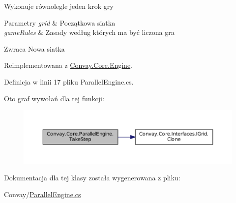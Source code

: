 Wykonuje równolegle jeden krok gry 


\begin{DoxyParams}{Parametry}
{\em grid} & Początkowa siatka\\
\hline
{\em game\+Rules} & Zasady według których ma być liczona gra\\
\hline
\end{DoxyParams}
\begin{DoxyReturn}{Zwraca}
Nowa siatka
\end{DoxyReturn}


Reimplementowana z \hyperlink{class_convay_1_1_core_1_1_engine_a02713f5cb5242a65d2e1816512e0b791}{Convay.\+Core.\+Engine}.



Definicja w linii 17 pliku Parallel\+Engine.\+cs.

Oto graf wywołań dla tej funkcji\+:
\nopagebreak
\begin{figure}[H]
\begin{center}
\leavevmode
\includegraphics[width=350pt]{class_convay_1_1_core_1_1_parallel_engine_a32e4a4911dcbb74f555b99944940d921_cgraph}
\end{center}
\end{figure}


Dokumentacja dla tej klasy została wygenerowana z pliku\+:\begin{DoxyCompactItemize}
\item 
Convay/\hyperlink{_parallel_engine_8cs}{Parallel\+Engine.\+cs}\end{DoxyCompactItemize}
